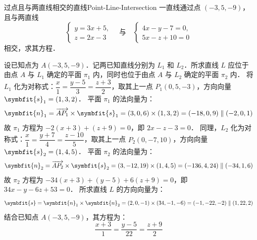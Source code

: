 \begin{problem}{过点且与两直线相交的直线}{Point-Line-Intersection}
    一直线通过点 $(-3, 5, -9)$，且与两直线
    \begin{equation*}
        \begin{cases} y = 3x + 5, \\ z = 2x - 3 \end{cases} \quad \text{与} \quad \begin{cases} 4x - y - 7 = 0, \\ 5x - z + 10 = 0 \end{cases}
    \end{equation*}
    相交，求其方程．
\end{problem}

\begin{solution}
    设已知点为 $A(-3, 5, -9)$．记两已知直线分别为 $L_1$ 和 $L_2$．所求直线 $L$ 应位于由点 $A$ 与 $L_1$ 确定的平面 $\pi_1$ 内，同时也位于由点 $A$ 与 $L_2$ 确定的平面 $\pi_2$ 内．
    将 $L_1$ 化为对称式：$\dfrac{x}{1} = \dfrac{y - 5}{3} = \dfrac{z + 3}{2}$，取其上一点 $P_1(0, 5, -3)$，方向向量 $\symbfit{s}_1 = (1, 3, 2)$．
    平面 $\pi_1$ 的法向量为：
    \begin{equation*}
        \symbfit{n}_1 = \overrightarrow{AP_1} \times \symbfit{s}_1 = (3, 0, 6) \times (1, 3, 2) = (-18, 0, 9) \parallel (-2, 0, 1)
    \end{equation*}
    故 $\pi_1$ 方程为 $-2(x + 3) + (z + 9) = 0$，即 $2x - z - 3 = 0$．
    同理，$L_2$ 化为对称式：$\dfrac{x}{1} = \dfrac{y + 7}{4} = \dfrac{z - 10}{5}$，取其上一点 $P_2(0, -7, 10)$，方向向量 $\symbfit{s}_2 = (1, 4, 5)$．
    平面 $\pi_2$ 的法向量为：
    \begin{equation*}
        \symbfit{n}_2 = \overrightarrow{AP_2} \times \symbfit{s}_2 = (3, -12, 19) \times (1, 4, 5) = (-136, 4, 24) \parallel (-34, 1, 6)
    \end{equation*}
    故 $\pi_2$ 方程为 $-34(x + 3) + (y - 5) + 6(z + 9) = 0$，即 $34x - y - 6z + 53 = 0$．
    所求直线 $L$ 的方向向量为：
    \begin{equation*}
        \symbfit{s} = \symbfit{n}_1 \times \symbfit{n}_2 = (2, 0, -1) \times (34, -1, -6) = (-1, -22, -2) \parallel (1, 22, 2)
    \end{equation*}
    结合已知点 $A(-3, 5, -9)$，其方程为：
    \begin{equation*}
        \boxed{\frac{x + 3}{1} = \frac{y - 5}{22} = \frac{z + 9}{2}}
    \end{equation*}
\end{solution}


